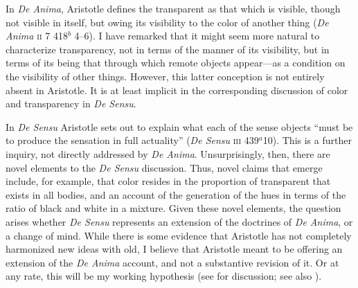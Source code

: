 In \emph{De Anima}, Aristotle defines the transparent as that which is visible, though not visible in itself, but owing its visibility to the color of another thing (\emph{De Anima} \textsc{ii} 7 418\( ^{b} \) 4--6). I have remarked that it might seem more natural to characterize transparency, not in terms of the manner of its visibility, but in terms of its being that through which remote objects appear---as a condition on the visibility of other things. However, this latter conception is not entirely absent in Aristotle. It is at least implicit in the corresponding discussion of color and transparency in \emph{De Sensu}.

In \emph{De Sensu} Aristotle sets out to explain what each of the sense objects ``must be to produce the sensation in full actuality'' (\emph{De Sensu} \textsc{iii} 439\( ^{a} \)10). This is a further inquiry, not directly addressed by \emph{De Anima}. Unsurprisingly, then, there are novel elements to the \emph{De Sensu} discussion. Thus, novel claims that emerge include, for example, that color resides in the proportion of transparent that exists in all bodies, and an account of the generation of the hues in terms of the ratio of black and white in a mixture. Given these novel elements, the question arises whether \emph{De Sensu} represents an extension of the doctrines of \emph{De Anima}, or a change of mind. While there is some evidence that Aristotle has not completely harmonized new ideas with old, I believe that Aristotle meant to be offering an extension of the \emph{De Anima} account, and not a substantive revision of it. Or at any rate, this will be my working hypothesis (see \citealt{Kahn:1966zr} for discussion; see also \citealt[291]{Caston:2005cr} \citealt[37]{Nussbaum:1995ly}).

